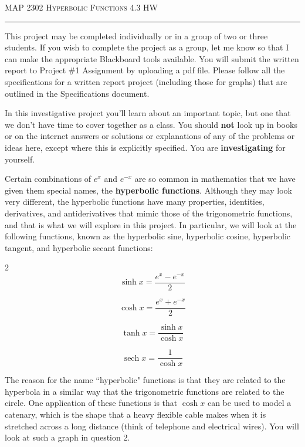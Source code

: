 \documentclass[12pt]{amsart}
\DeclareMathOperator{\sech}{sech}
\begin{document}
\thispagestyle{empty}

{\scshape MAP 2302} \hfill {\scshape \large Hyperbolic Functions} \hfill {4.3 HW\scshape }
 
\smallskip

\hrule

\bigskip

This project may be completed individually or in a group of two or three students.  If you wish to complete the project as a group, let me know so that I can make the appropriate Blackboard tools available.  You will submit the written report to Project \#1 Assignment by uploading a pdf file.  Please follow all the specifications for a written report project (including those for graphs) that are outlined in the Specifications document.

\bigskip

In this investigative project you'll learn about an important topic, but one that we don't have time to cover together as a class.  You should {\bf not} look up in books or on the internet answers or solutions or explanations of any of the problems or ideas here, except where this is explicitly specified.  You are {\bf investigating} for yourself.  

\medskip

Certain combinations of $e^x$ and $e^{-x}$ are so common in mathematics that we have given them special
names, the {\bf hyperbolic functions}. Although they may look very different, the hyperbolic functions
have many properties, identities, derivatives, and antiderivatives that mimic those of the trigonometric functions,
and that is what we will explore in this project. In particular, we will look at the following
functions, known as the hyperbolic sine, hyperbolic cosine, hyperbolic tangent, and hyperbolic
secant functions:
\begin{multicols}{2}
$$\sinh x = \frac{e^x - e^{-x}}{2}$$

$$\cosh x = \frac{e^x + e^{-x}}{2}$$

$$\tanh x = \frac{\sinh x}{\cosh x}$$

$$\sech x = \frac{1}{\cosh x}$$

\end{multicols}

The reason for the name ``hyperbolic" functions is that they are related to the hyperbola in a similar
way that the trigonometric functions are related to the circle. One application of these functions is
that $\cosh x$ can be used to model a catenary, which is the shape that a heavy flexible cable makes
when it is stretched across a long distance (think of telephone and electrical wires). You will look
at such a graph in question 2.
\end{document}
